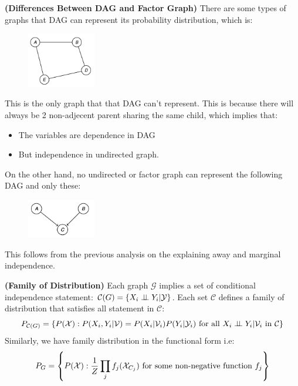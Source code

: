 \begin{remark}{\textbf{(Differences Between DAG and Factor Graph)}}
    There are some types of graphs that DAG can represent its probability distribution, which is:
    \begin{figure}[H]
        \centering
        \includegraphics[width=3cm]{img/img4.png}
    \end{figure}  
    This is the only graph that that DAG can't represent. This is because there will always be 2 non-adjecent parent sharing the same child, which implies that:
    \begin{itemize}
        \item The variables are dependence in DAG 
        \item But independence in undirected graph.
    \end{itemize}
    On the other hand, no undirected or factor graph can represent the following DAG and only these:
    \begin{figure}[H]
        \centering
        \includegraphics[width=3cm]{img/img5.png}
    \end{figure}  
    This follows from the previous analysis on the explaining away and marginal independence.
\end{remark}

\begin{definition}{\textbf{(Family of Distribution)}}
    Each graph $\mathcal{G}$ implies a set of conditional independence statement: $\mathcal{C}(G) = \left\{ X_i\perp \!\!\! \perp Y_i | \mathcal{Y} \right\}$. Each set $\mathcal{C}$ defines a family of distribution that satisfies all statement in $\mathcal{C}$:
    \begin{equation*}
        P_{\mathcal{C}(G)} = \left\{ P(\mathcal{X}) : P(X_i, Y_i | \mathcal{V}) = P(X_i | \mathcal{V}_i)P(Y_i|\mathcal{Y}_i) \text{ for all } X_i\perp \!\!\! \perp Y_i | \mathcal{V}_i \text{ in } \mathcal{C}   \right\}
    \end{equation*}
    Similarly, we have family distribution in the functional form i.e:
    \begin{equation*}
        P_{G} = \left\{ P(\mathcal{X}) : \frac{1}{Z}\prod_j f_j(\mathcal{X}_{C_j}) \text{ for some non-negative function } f_j  \right\}
    \end{equation*}
\end{definition}

